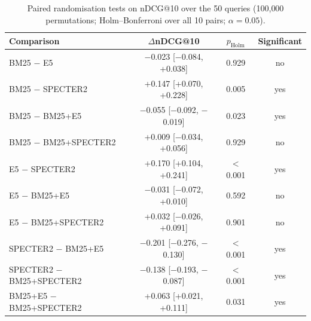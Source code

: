 \begin{table}[t]
\centering
\small
\caption{Paired randomisation tests on nDCG@10 over the 50 queries (100{,}000 permutations; Holm--Bonferroni over all 10 pairs; $\alpha=0.05$). }
\label{tab:fsig}
\begin{tabular}{lccc}
\toprule
Comparison & $\Delta$nDCG@10 & $p_{\text{Holm}}$ & Significant \\
\midrule
BM25 $-$ E5 & $-$0.023 [$-$0.084, +0.038] & 0.929 & no \\
BM25 $-$ SPECTER2 & +0.147 [+0.070, +0.228] & 0.005 & yes \\
BM25 $-$ BM25+E5 & $-$0.055 [$-$0.092, $-$0.019] & 0.023 & yes \\
BM25 $-$ BM25+SPECTER2 & +0.009 [$-$0.034, +0.056] & 0.929 & no \\
E5 $-$ SPECTER2 & +0.170 [+0.104, +0.241] & $<$0.001 & yes \\
E5 $-$ BM25+E5 & $-$0.031 [$-$0.072, +0.010] & 0.592 & no \\
E5 $-$ BM25+SPECTER2 & +0.032 [$-$0.026, +0.091] & 0.901 & no \\
SPECTER2 $-$ BM25+E5 & $-$0.201 [$-$0.276, $-$0.130] & $<$0.001 & yes \\
SPECTER2 $-$ BM25+SPECTER2 & $-$0.138 [$-$0.193, $-$0.087] & $<$0.001 & yes \\
BM25+E5 $-$ BM25+SPECTER2 & +0.063 [+0.021, +0.111] & 0.031 & yes \\
\bottomrule
\end{tabular}
\end{table}
